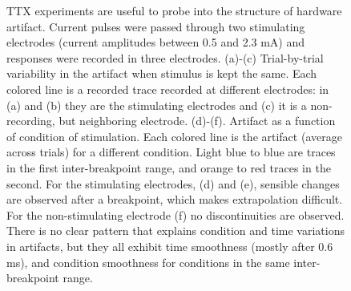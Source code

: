 \documentclass[12pt,letterpaper,fleqn]{article}
\begin{document}
\begin{figure}[ht!]
\begin{subfigure}[b]{0.32\textwidth}
        \end{subfigure}
\caption{TTX experiments are useful to probe into the structure of hardware artifact. Current pulses were passed through two stimulating electrodes (current amplitudes between 0.5 and 2.3 mA) and responses were recorded in three electrodes.
 (a)-(c) Trial-by-trial variability in the artifact when stimulus is kept the same. Each colored line is a recorded trace recorded at different electrodes: in (a) and (b) they are the stimulating electrodes and (c) it is a non-recording, but neighboring electrode. (d)-(f). Artifact as a function of condition of stimulation. Each colored line is the artifact (average across trials) for a different condition. Light blue to blue are traces in the first inter-breakpoint range, and orange to red traces in the second. For the stimulating electrodes, (d) and (e), sensible changes are observed after a breakpoint, which makes extrapolation difficult. For the non-stimulating electrode (f) no discontinuities are observed. There is no clear pattern that explains condition and time variations in artifacts, but they all exhibit time smoothness (mostly after 0.6 ms), and condition smoothness for conditions in the same inter-breakpoint range.
}
\label{fig:ttx}
\end{figure}
\pagebreak
\end{document}
